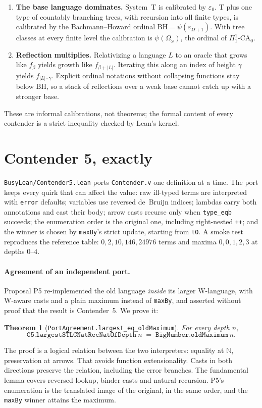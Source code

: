\documentclass[11pt]{article}
\newtheorem{theorem}{Theorem}
\theoremstyle{definition}
\theoremstyle{remark}
\newcommand{\N}{\mathbb{N}}
\newcommand{\lean}[1]{\texttt{#1}}
\newcommand{\BH}{\ensuremath{\mathrm{BH}}}
\begin{document}
\begin{enumerate}[leftmargin=*]
\item \textbf{The base language dominates.} System~T is calibrated by $\varepsilon_0$.
  T plus one type of countably branching trees, with recursion into all finite
  types, is calibrated by the Bachmann--Howard ordinal
  $\BH=\psi(\varepsilon_{\Omega+1})$. With tree classes at every finite level
  the calibration is $\psi(\Omega_\omega)$, the ordinal of $\Pi^1_1$-CA$_0$.
\item \textbf{Reflection multiplies.} Relativizing a language $L$ to an oracle
  that grows like $f_\beta$ yields growth like $f_{\beta+|L|}$. Iterating this
  along an index of height $\gamma$ yields $f_{|L|\cdot\gamma}$. Explicit
  ordinal notations without collapsing functions stay below \BH, so a stack of
  reflections over a weak base cannot catch up with a stronger base.
\end{enumerate}

These are informal calibrations, not theorems; the formal content of every
contender is a strict inequality checked by Lean's kernel.

\section{Contender 5, exactly}

\lean{BusyLean/Contender5.lean} ports \lean{Contender.v} one definition at a
time. The port keeps every quirk that can affect the value: raw ill-typed terms
are interpreted with \lean{error} defaults; variables use reversed de~Bruijn
indices; lambdas carry both annotations and cast their body; arrow casts recurse
only when \lean{type\_eqb} succeeds; the enumeration order is the original one,
including right-nested \lean{++}; and the winner is chosen by \lean{maxBy}'s
strict update, starting from \lean{tO}. A smoke test reproduces the reference
table: $0,2,10,146,24976$ terms and maxima $0,0,1,2,3$ at depths $0$--$4$.

\paragraph{Agreement of an independent port.} Proposal P5 re-implemented the old
language \emph{inside} its larger W-language, with W-aware casts and a plain
maximum instead of \lean{maxBy}, and asserted without proof that the result is
Contender~5. We prove it:
\begin{theorem}[\lean{PortAgreement.largest\_eq\_oldMaximum}]
For every depth $n$,
\[\texttt{C5.largestSTLCNatRecNatOfDepth}\ n \;=\; \texttt{BigNumber.oldMaximum}\ n.\]
\end{theorem}
The proof is a logical relation between the two interpreters: equality at
$\N$, preservation at arrows. That avoids function extensionality. Casts in both
directions preserve the relation, including the error branches. The fundamental
lemma covers reversed lookup, binder casts and natural recursion. P5's
enumeration is the translated image of the original, in the same order, and the
\lean{maxBy} winner attains the maximum.
\end{document}
